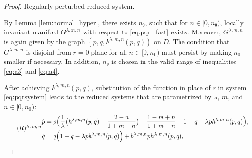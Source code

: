 \documentclass[a4paper,11pt]{article}
\begin{document}
\smallskip
\noindent
\begin{proof}
\medskip {}
 Regularly perturbed reduced system.
\medskip

By Lemma \ref{lem:normal_hyper}, there exists $n_0$, such that for $n \in [0, n_0)$, locally invariant manifold $G^{\lambda,m,n}$ with respect to \eqref{eq:pqr_fast} exists. Moreover,   $G^{\lambda,m,n}$ is again given by the graph $(p,q,h^{\lambda,m,n}(p,q))$ on $\bar{D}$. The condition that $G^{\lambda,m,n}$ is disjoint from $r=0$ plane for all $n \in [0, n_0)$ must persist by making $n_0$ smaller if necessary. In addition, $n_0$ is chosen in the valid range of inequalities \eqref{eq:a3} and \eqref{eq:a4}.%

After achieving $h^{\lambda,m,n}(p,q)$, substitution of the function in place of $r$ in system \eqref{eq:pqrsystem} leads to  the reduced systems that are parametrized by $\lambda$, $m$, and $n\in[0,n_0)$:
{\small
\begin{equation} \tag*{(${R}$)\textsuperscript{$\lambda,m,n$}} \label{eq:reduced}
\begin{split}
 \dot{p} &=p\Big(\frac{1}{ \lambda }\big(h^{\lambda,m,n}(p,q) - \frac{2-n}{1+m-n}\big) - \frac{1-m+n}{1+m-n} + 1-q- \lambda p h^{\lambda,m,n}(p,q)\Big),\\
 \dot{q} &=q\Big(                                                                          1-q- \lambda p h^{\lambda,m,n}(p,q)\Big) + b^{\lambda,m,n}ph^{\lambda,m,n}(p,q),
\end{split}
\end{equation}
}


\end{proof}
\end{document}
